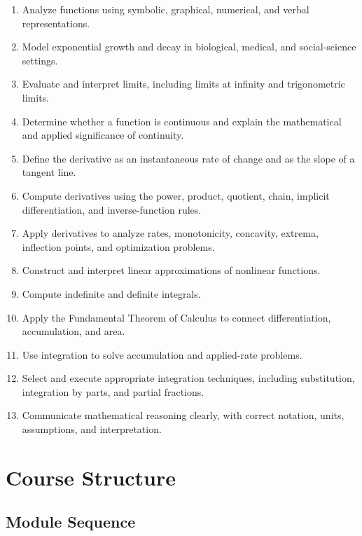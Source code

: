 \documentclass[11pt]{article}
\begin{document}
\begin{enumerate}
    \item Analyze functions using symbolic, graphical, numerical, and verbal representations.
    \item Model exponential growth and decay in biological, medical, and social-science settings.
    \item Evaluate and interpret limits, including limits at infinity and trigonometric limits.
    \item Determine whether a function is continuous and explain the mathematical and applied significance of continuity.
    \item Define the derivative as an instantaneous rate of change and as the slope of a tangent line.
    \item Compute derivatives using the power, product, quotient, chain, implicit differentiation, and inverse-function rules.
    \item Apply derivatives to analyze rates, monotonicity, concavity, extrema, inflection points, and optimization problems.
    \item Construct and interpret linear approximations of nonlinear functions.
    \item Compute indefinite and definite integrals.
    \item Apply the Fundamental Theorem of Calculus to connect differentiation, accumulation, and area.
    \item Use integration to solve accumulation and applied-rate problems.
    \item Select and execute appropriate integration techniques, including substitution, integration by parts, and partial fractions.
    \item Communicate mathematical reasoning clearly, with correct notation, units, assumptions, and interpretation.
\end{enumerate}

\section{Course Structure}

\subsection{Module Sequence}
\end{document}
